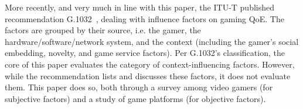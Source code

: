 More recently, and very much in line with this paper, the \acrshort{ITU-T}
published recommendation G.1032~\cite{mollertowards, itutg1032}, dealing with
influence factors on gaming \gls{QoE}. The factors are grouped by
their source, i.e. the gamer, the hardware/software/network system,
and the context (including the gamer's social embedding, novelty,
and game service factors). Per G.1032's classification, the core of
this paper evaluates the category of context-influencing factors.
However, while the recommendation lists and discusses these factors,
it does not evaluate them. This paper does so, both through a survey
among video gamers (for subjective factors) and a study of
game platforms (for objective factors).
